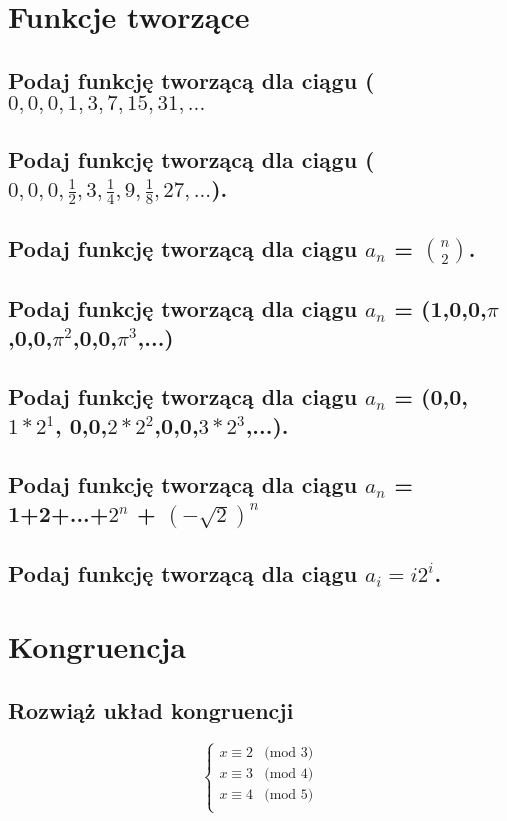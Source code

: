 \documentclass[12pt]{article}
\begin{document}
\section{Funkcje tworzące}

\subsection{Podaj funkcję tworzącą dla ciągu ($0, 0, 0, 1, 3, 7, 15, 31, ... $}

\subsection{Podaj funkcję tworzącą dla ciągu ($0, 0, 0,\frac{1}{2}, 3, \frac{1}{4}, 9, \frac{1}{8}, 27, ...$).}

\newpage

\subsection{Podaj funkcję tworzącą dla ciągu $a_n$ = ${n}\choose{2}$.}

\subsection{Podaj funkcję tworzącą dla ciągu $a_n$ = (1,0,0,$\pi$,0,0,$\pi^2$,0,0,$\pi^3$,...)}

\subsection{Podaj funkcję tworzącą dla ciągu $a_n$ = (0,0,$1*2^1$, 0,0,$2*2^2$,0,0,$3*2^3$,...).}

\subsection{Podaj funkcję tworzącą dla ciągu $a_n$ = 1+2+...+$2^n$ + $(-\sqrt{2})^n$}

\subsection{Podaj funkcję tworzącą dla ciągu $a_i=i2^i$.}



\section{Kongruencja}

\subsection{Rozwiąż układ kongruencji}
$$
\left\{ \begin{array}{ll}
x \equiv 2 & \textrm{(mod 3)}\\
x \equiv 3 & \textrm{(mod 4)}\\
x \equiv 4 & \textrm{(mod 5)}\\
\end{array} \right.
$$
\end{document}
